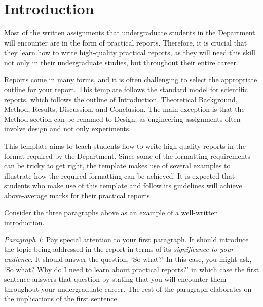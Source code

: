 \documentclass[a4paper, onecolumn, 12pt]{IEEEtran}
\begin{document}
\sloppy






\pagestyle{plain}
\setcounter{tocdepth}{2}
\tableofcontents
\clearpage
{}
\setcounter{page}{1}
\pagestyle{fancy}


\section{Introduction}
\label{sec:introduction}

Most of the written assignments that undergraduate students in the Department will encounter are in the form of practical reports. Therefore, it is crucial that they learn how to write high-quality practical reports, as they will need this skill not only in their undergraduate studies, but throughout their entire career.

Reports come in many forms, and it is often challenging to select the appropriate outline for your report. This template follows the standard model for scientific reports, which follows the outline of Introduction, Theoretical Background, Method, Results, Discussion, and Conclusion. The main exception is that the Method section can be renamed to Design, as engineering assignments often involve design and not only experiments.

This template aims to teach students how to write high-quality reports in the format required by the Department. Since some of the formatting requirements can be tricky to get right, the template makes use of several examples to illustrate how the required formatting can be achieved. It is expected that students who make use of this template and follow its guidelines will achieve above-average marks for their practical reports.

Consider the three paragraphs above as an example of a well-written introduction. 

\textit{Paragraph 1}: Pay special attention to your first paragraph. It should introduce the topic being addressed in the report in terms of its \textit{significance to your audience}. It should answer the question, `So what?' In this case, you might ask, `So what? Why do I need to learn about practical reports?' in which case the first sentence answers that question by stating that you will encounter them throughout your undergraduate career. The rest of the paragraph elaborates on the implications of the first sentence.
\end{document}
